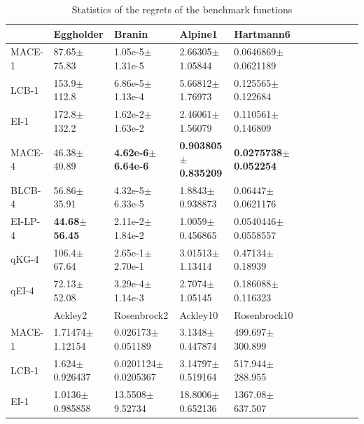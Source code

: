 \begin{table}[!htb]
    \centering
    \caption{Statistics of the regrets of the benchmark functions}
    \label{tab:result_analytical}
    \begin{tabular}{lllllllllll}
        \toprule
                & Eggholder                &  Branin              &  Alpine1              & Hartmann6                   \\ \midrule
        MACE-1  & 87.65$\pm$75.83          &  1.05e-5$\pm$1.31e-5          & 2.66305$\pm$1.05844            & 0.0646869$\pm$0.0621189 \\
        LCB-1   & 153.9$\pm$112.8          &  6.86e-5$\pm$1.13e-4          & 5.66812$\pm$1.76973            & 0.125565$\pm$0.122684   \\
        EI-1    & 172.8$\pm$132.2          &  1.62e-2$\pm$1.63e-2          & 2.46061$\pm$1.56079            & 0.110561$\pm$0.146809   \\
        MACE-4  & 46.38$\pm$40.89          &  \textbf{4.62e-6$\pm$6.64e-6} & \textbf{0.903805$\pm$0.835209} & \textbf{0.0275738$\pm$0.052254}  \\
        BLCB-4  & 56.86$\pm$35.91          &  4.32e-5$\pm$6.33e-5          & 1.8843$\pm$0.938873            & 0.06447$\pm$0.0621176   \\
        EI-LP-4 & \textbf{44.68$\pm$56.45} &  2.11e-2$\pm$1.84e-2          & 1.0059$\pm$0.456865            & 0.0540446$\pm$0.0558557 \\
        qKG-4   & 106.4$\pm$67.64          &  2.65e-1$\pm$2.70e-1          & 3.01513$\pm$1.13414            & 0.47134$\pm$0.18939     \\
        qEI-4   & 72.13$\pm$52.08          &  3.29e-4$\pm$1.14e-3          & 2.7074$\pm$1.05145             & 0.186088$\pm$0.116323   \\
        \hline
                & Ackley2                       &  Rosenbrock2               & Ackley10              & Rosenbrock10        \\ \midrule
        MACE-1  & 1.71474$\pm$1.12154           &  0.026173$\pm$0.051189              & 3.1348$\pm$0.447874           & 499.697$\pm$300.899 \\
        LCB-1   & 1.624$\pm$0.926437            &  0.0201124$\pm$0.0205367            & 3.14797$\pm$0.519164          & 517.944$\pm$288.955 \\
        EI-1    & 1.0136$\pm$0.985858           &  13.5508$\pm$9.52734                & 18.8006$\pm$0.652136          & 1367.08$\pm$637.507 \\

\end{tabular}
\end{table}
